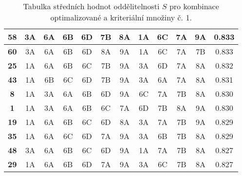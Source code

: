 \begin{table}[h!]
{\begin{tabular}{|c||c|c|c|c|c|c||c|c|c|c||c|}
\hline
\textbf{58} & 3A & 6A & 6B & 6D & 7B & 8A & 1A & 6C & 7A & 9A & 0.833 \\
\hline
\textbf{60} & 3A & 6A & 6B & 6D & 8A & 9A & 1A & 6C & 7A & 7B & 0.833 \\
\hline
\textbf{25} & 1A & 6A & 6B & 6C & 7B & 9A & 3A & 6D & 7A & 8A & 0.832 \\
\hline
\textbf{43} & 1A & 6B & 6C & 6D & 7B & 9A & 3A & 6A & 7A & 8A & 0.831 \\
\hline
\textbf{8} & 1A & 3A & 6A & 6B & 6D & 9A & 6C & 7A & 7B & 8A & 0.830 \\
\hline
\textbf{1} & 1A & 3A & 6A & 6B & 6C & 7A & 6D & 7B & 8A & 9A & 0.830 \\
\hline
\textbf{19} & 1A & 6A & 6B & 6C & 6D & 8A & 3A & 7A & 7B & 9A & 0.829 \\
\hline
\textbf{35} & 1A & 6A & 6C & 6D & 7A & 9A & 3A & 6B & 7B & 8A & 0.829 \\
\hline
\textbf{48} & 3A & 6A & 6B & 6C & 6D & 9A & 1A & 7A & 7B & 8A & 0.827 \\
\hline
\textbf{29} & 1A & 6A & 6B & 6D & 7A & 9A & 3A & 6C & 7B & 8A & 0.827 \\
\hline
\end{tabular}
}
\caption[Střední hodnota $S$ - tabulka č. 1.]{Tabulka středních hodnot oddělitelnosti $S$ pro kombinace optimalizované a kriteriální množiny č. 1.}
\label{table: MeanSeperability1}
\end{table}

\clearpage

